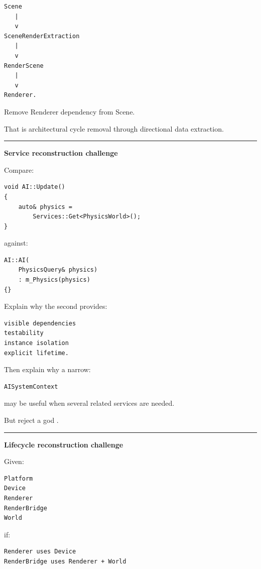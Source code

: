 \begin{verbatim}
Scene
   |
   v
SceneRenderExtraction
   |
   v
RenderScene
   |
   v
Renderer.
\end{verbatim}

Remove Renderer dependency from Scene.

That is architectural cycle removal through directional data extraction.

\begin{center}\rule{0.5\linewidth}{0.5pt}\end{center}

\textbf{Service reconstruction challenge}

Compare:

\begin{verbatim}
void AI::Update()
{
    auto& physics =
        Services::Get<PhysicsWorld>();
}
\end{verbatim}

against:

\begin{verbatim}
AI::AI(
    PhysicsQuery& physics)
    : m_Physics(physics)
{}
\end{verbatim}

Explain why the second provides:

\begin{verbatim}
visible dependencies
testability
instance isolation
explicit lifetime.
\end{verbatim}

Then explain why a narrow:

\begin{verbatim}
AISystemContext
\end{verbatim}

may be useful when several related services are needed.

But reject a god .

\begin{center}\rule{0.5\linewidth}{0.5pt}\end{center}

\textbf{Lifecycle reconstruction challenge}

Given:

\begin{verbatim}
Platform
Device
Renderer
RenderBridge
World
\end{verbatim}

if:

\begin{verbatim}
Renderer uses Device
RenderBridge uses Renderer + World
\end{verbatim}

